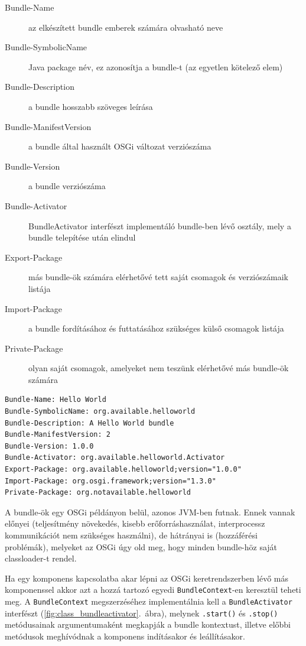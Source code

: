 \begin{description}
	\item[Bundle-Name] az elkészített bundle emberek számára olvasható neve
	\item[Bundle-SymbolicName] Java package név, ez azonosítja a bundle-t (az egyetlen kötelező elem)
	\item[Bundle-Description] a bundle hosszabb szöveges leírása
	\item[Bundle-ManifestVersion] a bundle által használt OSGi változat verziószáma
	\item[Bundle-Version] a bundle verziószáma
	\item[Bundle-Activator] BundleActivator interfészt implementáló bundle-ben lévő osztály, mely a bundle telepítése után elindul
	\item[Export-Package] más bundle-ök számára elérhetővé tett saját csomagok és verziószámaik listája
	\item[Import-Package] a bundle fordításához és futtatásához szükséges külső csomagok listája
	\item[Private-Package] olyan saját csomagok, amelyeket nem teszünk elérhetővé más bundle-ök számára
\end{description}

\begin{lstlisting}[label={lst:manifest}, caption=MANIFEST.MF,breaklines=true]
Bundle-Name: Hello World
Bundle-SymbolicName: org.available.helloworld
Bundle-Description: A Hello World bundle
Bundle-ManifestVersion: 2
Bundle-Version: 1.0.0
Bundle-Activator: org.available.helloworld.Activator
Export-Package: org.available.helloworld;version="1.0.0"
Import-Package: org.osgi.framework;version="1.3.0"
Private-Package: org.notavailable.helloworld
\end{lstlisting}


A bundle-ök egy OSGi példányon belül, azonos JVM-ben futnak. Ennek vannak előnyei (teljesítmény növekedés, kisebb erőforráshasználat, interprocessz kommunikációt nem szükséges használni), de hátrányai is (hozzáférési problémák), melyeket az OSGi úgy old meg, hogy minden bundle-höz saját classloader-t rendel.

Ha egy komponens kapcsolatba akar lépni az OSGi keretrendszerben lévő más komponenssel akkor azt a hozzá tartozó egyedi \texttt{BundleContext}-en keresztül teheti meg. A \texttt{BundleContext} megszerzéséhez implementálnia kell a \texttt{BundleActivator} interfészt (\ref{fig:class_bundleactivator}.~ábra), melynek \texttt{.start()} és \texttt{.stop()} metódusainak argumentumaként megkapják a bundle kontextust, illetve előbbi metódusok meghívódnak a komponens indításakor és leállításakor.

